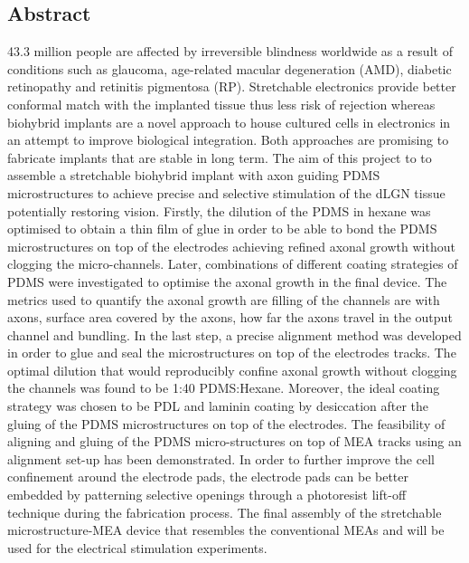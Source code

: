 \begin{center}\section*{Abstract}\end{center}
%

43.3 million people are affected by irreversible blindness worldwide as a result of conditions such as glaucoma, age-related macular degeneration (AMD), diabetic retinopathy and retinitis pigmentosa (RP). Stretchable electronics provide better conformal match with the implanted tissue thus less risk of rejection whereas biohybrid implants are a novel approach to house cultured cells in electronics in an attempt to improve biological integration. Both approaches are promising to fabricate implants that are stable in long term. The aim of this project to to assemble a stretchable biohybrid implant with axon guiding PDMS microstructures to achieve precise and selective stimulation of the dLGN tissue potentially restoring vision. Firstly, the dilution of the PDMS in hexane was optimised to obtain a thin film of glue in order to be able to bond the PDMS microstructures on top of the electrodes achieving refined axonal growth without clogging the micro-channels. Later, combinations of different coating strategies of PDMS were investigated to optimise the axonal growth in the final device. The metrics used to quantify the axonal growth are filling of the channels are with axons, surface area covered by the axons, how far the axons travel in the output channel and bundling. In the last step, a precise alignment method was developed in order to glue and seal the microstructures on top of the electrodes tracks. The optimal dilution that would reproducibly confine axonal growth without clogging the channels was found to be 1:40 PDMS:Hexane. Moreover, the ideal coating strategy was chosen to be PDL and laminin coating by desiccation after the gluing of the PDMS microstructures on top of the electrodes. The feasibility of aligning and gluing of the PDMS micro-structures on top of MEA tracks using an alignment set-up has been demonstrated. In order to further improve the cell confinement around the electrode pads, the electrode pads can be better embedded by patterning selective openings through a photoresist lift-off technique during the fabrication process. The final assembly of the stretchable microstructure-MEA device that resembles the conventional MEAs and will be used for the electrical stimulation experiments.




